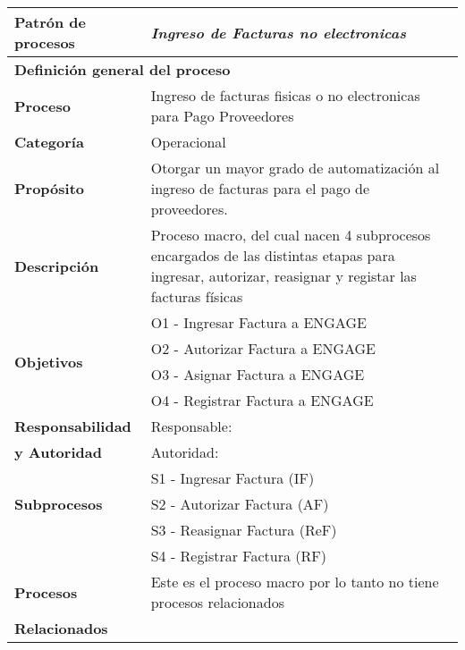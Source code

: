 \begin{longtable}{|llrrrrrr|}
	\hline
	\multicolumn{2}{|l|}{\textbf{Patrón de procesos}} & \multicolumn{6}{|l|}{\textit{Ingreso de Facturas no electronicas}} \\ \hline
	\multicolumn{8}{|l|}{\textbf{Definición general del proceso}} \\ \hline
	\textbf{Proceso} & \multicolumn{7}{|m{12cm}|}{Ingreso de facturas fisicas o no electronicas para Pago Proveedores} \\ \hline
	\textbf{Categoría} & \multicolumn{7}{|m{12cm}|}{Operacional} \\ \hline
	\textbf{Propósito} & \multicolumn{7}{|m{12cm}|}{Otorgar un mayor grado de automatización al ingreso de facturas para el pago de proveedores.} \\ \hline
    \textbf{Descripción} & \multicolumn{7}{|m{12cm}|}{Proceso macro, del cual nacen 4 subprocesos encargados de las distintas etapas para ingresar, autorizar, reasignar y registar las facturas físicas} \\ \hline
	\multirow{4}[6]{*}{\textbf{Objetivos}} 
		  & \multicolumn{7}{|l|}{O1 - Ingresar Factura a ENGAGE} \\ \cline{2-8}
          & \multicolumn{7}{|l|}{O2 - Autorizar Factura a ENGAGE} \\ \cline{2-8}
          & \multicolumn{7}{|l|}{O3 - Asignar Factura a ENGAGE} \\ \hline
          & \multicolumn{7}{|l|}{O4 - Registrar Factura a ENGAGE} \\ \hline
    \multicolumn{1}{|l|}{\textbf{Responsabilidad}} 	& \multicolumn{7}{|l|}{Responsable: } \\
	\multicolumn{1}{|l|}{\textbf{y Autoridad}} 	& \multicolumn{7}{|l|}{Autoridad: } \\ \hline
	\multirow{3}[4]{*}{\textbf{Subprocesos}} 
		  & \multicolumn{7}{|l|}{S1 - Ingresar Factura (IF)} \\  \cline{2-8} 
	      & \multicolumn{7}{|l|}{S2 - Autorizar Factura (AF)} \\  \cline{2-8} 
	      & \multicolumn{7}{|l|}{S3 - Reasignar Factura (ReF)} \\ \cline{2-8}
	      & \multicolumn{7}{|l|}{S4 - Registrar Factura (RF)} \\ \hline
    \multicolumn{1}{|l|}{\textbf{Procesos}} 	& \multicolumn{7}{|l|}{Este es el proceso macro por lo tanto no tiene procesos relacionados} \\
	\multicolumn{1}{|l|}{\textbf{Relacionados}} 	&  \multicolumn{7}{|l|}{} \\ \hline

\end{longtable}
